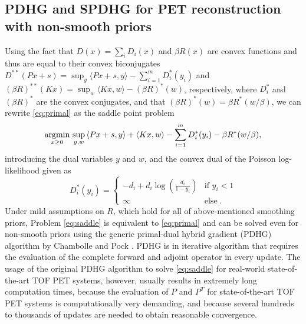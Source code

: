 \subsection*{PDHG and SPDHG for PET reconstruction with non-smooth priors}

Using the fact that $D(x) = \sum_i D_i(x)$ and $\beta R(x)$ are convex functions and thus are
equal to their convex biconjugates 
$D^{**}(Px + s) = \sup_y \langle Px + s, y \rangle - \sum_{i=1}^{m} D_i^*(y_i)$ 
and $(\beta R)^{**}(Kx) = \sup_w \langle Kx, w \rangle - (\beta R)^*(w)$, respectively, 
where $D_i^*$ and $(\beta R)^*$ are the convex conjugates,
and that $(\beta R)^*(w) = \beta R^*(w / \beta)$, 
we can rewrite \eqref{eq:primal} as the saddle point problem
%
\begin{equation}
\operatorname*{argmin}_{x\geq 0} \, \sup_{y,w} \,  \langle Px + s, y \rangle + \langle Kx, w \rangle - \sum_{i=1}^{m} D_i^*(y_i) - \beta R^*(w/\beta) ,
\label{eq:saddle}
\end{equation}
%
introducing the dual variables $y$ and $w$, and the convex dual of the Poisson log-likelihood given as
%
\begin{equation}
D_i^*(y_i) =
\begin{cases}
-d_i + d_i \log \left( \frac{d_i}{1-y_i} \right) & \text{if } y_i < 1 \\
\infty & \text{else} \ .
\end{cases}
\end{equation}
%
Under mild assumptions on $R$, which hold for all of above-mentioned smoothing priors, Problem \eqref{eq:saddle} is equivalent to \eqref{eq:primal} and
can be solved even for non-smooth priors using the generic primal-dual hybrid gradient (PDHG) 
algorithm by Chambolle and Pock \cite{Chambolle2011}.
PDHG is in iterative algorithm that requires the evaluation of the complete forward and adjoint operator
in every update.
The usage of the original PDHG algorithm to solve \eqref{eq:saddle} for real-world state-of-the-art
TOF PET systems, however, usually results in extremely long computation times, 
because the evaluation of $P$ and $P^T$
for state-of-the-art TOF PET systems is computationally very demanding, and 
because several hundreds to thousands of updates are needed to obtain reasonable convergence.

